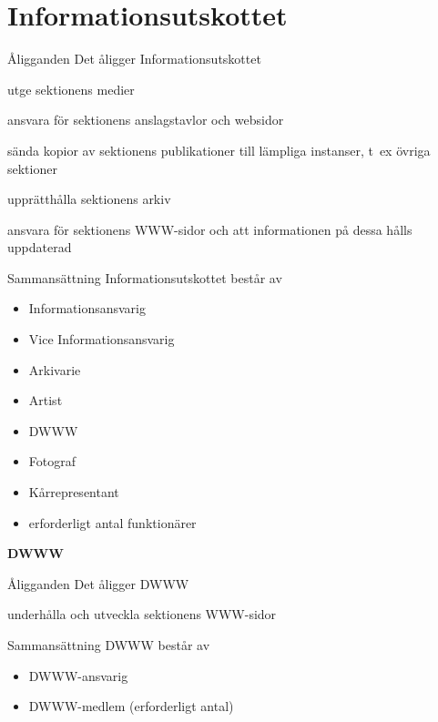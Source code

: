 \documentclass[pdfbookmarks,a4paper,11pt]{article}
\newlength{\itemcollength}
\newenvironment{reglemlista}{%
  \begin{list}{}{%
      \setlength{\labelwidth}{\itemcollength}%
      \setlength{\leftmargin}{\labelwidth + \labelsep}%
      \renewcommand{\makelabel}[1]{%
        \raisebox{0pt}[1ex][0pt]{%
          \makebox[\labelwidth][l]{%
            \parbox[t]{\itemcollength}{%
              \raggedright\hspace{0pt}##1}}}\hfill}%
      }}{%
  \end{list}}
\begin{document}
\section{Informationsutskottet}

\begin{reglemlista}

	\item[Åligganden]
	Det åligger Informationsutskottet
	\begin{attlista}
		\item utge sektionens medier
		\item ansvara för sektionens anslagstavlor och websidor
		\item sända kopior av sektionens publikationer till lämpliga instanser, t~ex övriga sektioner
		\item upprätthålla sektionens arkiv
		\item ansvara för sektionens WWW-sidor och att informationen på dessa hålls uppdaterad
	\end{attlista}

	\item[Sammansättning]
	Informationsutskottet består av
	\begin{itemize}
		\item Informationsansvarig
		\item Vice Informationsansvarig
		\item Arkivarie
		\item Artist
		\item DWWW
		\item Fotograf
		\item Kårrepresentant
		\item erforderligt antal funktionärer
	\end{itemize}

	\item[\textbf{DWWW}]

	\item[Åligganden]
	Det åligger DWWW
	\begin{attlista}
		\item underhålla och utveckla sektionens WWW-sidor
	\end{attlista}

	\item[Sammansättning]
	DWWW består av
	\begin{itemize}
		\item DWWW-ansvarig
		\item DWWW-medlem (erforderligt antal)
	\end{itemize}

\end{reglemlista}
\end{document}
